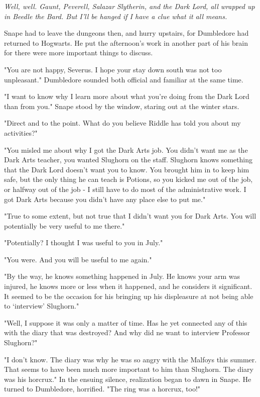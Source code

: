 \documentclass[a4paper,11pt]{article}
\begin{document}
\emph{Well, well. Gaunt, Peverell, Salazar Slytherin, and the Dark Lord, all wrapped up in Beedle the Bard. But I'll be hanged if I have a clue what it all means.}

Snape had to leave the dungeons then, and hurry upstairs, for Dumbledore had returned to Hogwarts. He put the afternoon's work in another part of his brain for there were more important things to discuss.

"You are not happy, Severus. I hope your stay down south was not too unpleasant." Dumbledore sounded both official and familiar at the same time.

"I want to know why I learn more about what you're doing from the Dark Lord than from you." Snape stood by the window, staring out at the winter stars.

"Direct and to the point. What do you believe Riddle has told you about my activities?"

"You misled me about why I got the Dark Arts job. You didn't want me as the Dark Arts teacher, you wanted Slughorn on the staff. Slughorn knows something that the Dark Lord doesn't want you to know. You brought him in to keep him safe, but the only thing he can teach is Potions, so you kicked me out of the job, or halfway out of the job - I still have to do most of the administrative work. I got Dark Arts because you didn't have any place else to put me."

"True to some extent, but not true that I didn't want you for Dark Arts. You will potentially be very useful to me there."

"Potentially? I thought I was useful to you in July."

"You were. And you will be useful to me again."

"By the way, he knows something happened in July. He knows your arm was injured, he knows more or less when it happened, and he considers it significant. It seemed to be the occasion for his bringing up his displeasure at not being able to `interview' Slughorn."

"Well, I suppose it was only a matter of time. Has he yet connected any of this with the diary that was destroyed? And why did ne want to interview Professor Slughorn?"

"I don't know. The diary was why he was so angry with the Malfoys this summer. That seems to have been much more important to him than Slughorn. The diary was his horcrux." In the ensuing silence, realization began to dawn in Snape. He turned to Dumbledore, horrified. "The ring was a horcrux, too!"
\end{document}
